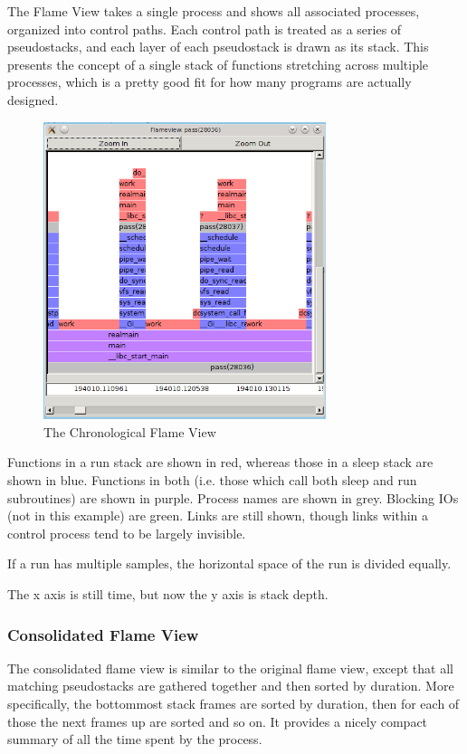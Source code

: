 \documentclass[10pt]{article}
\begin{document}
The Flame View takes a single process and shows all associated processes, organized into control paths.  Each control path is treated as a series of pseudostacks, and each layer of each pseudostack is drawn as its stack.  This presents the concept of a single stack of functions stretching across multiple processes, which is a pretty good fit for how many programs are actually designed.

\begin{figure}[h]
\includegraphics[width=3.25in]{flameshot}
\caption{The Chronological Flame View}
\end{figure}

Functions in a run stack are shown in red, whereas those in a sleep stack are shown in blue.  Functions in both (i.e. those which call both sleep and run subroutines) are shown in purple. Process names are shown in grey.  Blocking IOs (not in this example) are green.  Links are still shown, though links within a control process tend to be largely invisible.

If a run has multiple samples, the horizontal space of the run is divided equally.

The x axis is still time, but now the y axis is stack depth.

\subsubsection{Consolidated Flame View}

The consolidated flame view is similar to the original flame view, except that all matching pseudostacks are gathered together and then sorted by duration.  More specifically, the bottommost stack frames are sorted by duration, then for each of those the next frames up are sorted and so on.  It provides a nicely compact summary of all the time spent by the process.
\end{document}
